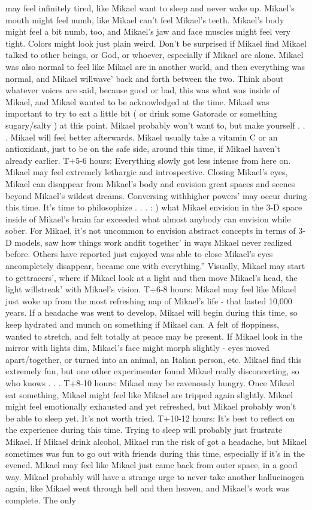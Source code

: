 \documentclass[12pt]{book}
\begin{document}
may feel infinitely tired, like Mikael want to sleep and never wake up. Mikael's mouth might feel numb, like Mikael can't feel Mikael's teeth. Mikael's body might feel a bit numb, too, and Mikael's jaw and face muscles might feel very tight. Colors might look just plain weird. Don't be surprised if Mikael find Mikael talked to other beings, or God, or whoever, especially if Mikael are alone. Mikael was also normal to feel like Mikael are in another world, and then everything was normal, and Mikael willwave' back and forth between the two. Think about whatever voices are said, because good or bad, this was what was inside of Mikael, and Mikael wanted to be acknowledged at the time. Mikael was important to try to eat a little bit ( or drink some Gatorade or something sugary/salty ) at this point. Mikael probably won't want to, but make yourself . . .  Mikael will feel better afterwards. Mikael usually take a vitamin C or an antioxidant, just to be on the safe side, around this time, if Mikael haven't already earlier. T+5-6 hours: Everything slowly got less intense from here on. Mikael may feel extremely lethargic and introspective. Closing Mikael's eyes, Mikael can disappear from Mikael's body and envision great spaces and scenes beyond Mikael's wildest dreams. Conversing withhigher powers' may occur during this time. It's time to philosophize . . . : ) what Mikael envision in the 3-D space inside of Mikael's brain far exceeded what almost anybody can envision while sober. For Mikael, it's not uncommon to envision abstract concepts in terms of 3-D models, saw how things work andfit together' in ways Mikael never realized before. Others have reported just enjoyed was able to close Mikael's eyes ancompletely disappear, became one with everything.'' Visually, Mikael may start to gettracers', where if Mikael look at a light and then move Mikael's head, the light willstreak' with Mikael's vision. T+6-8 hours: Mikael may feel like Mikael just woke up from the most refreshing nap of Mikael's life - that lasted 10,000 years. If a headache was went to develop, Mikael will begin during this time, so keep hydrated and munch on something if Mikael can. A felt of floppiness, wanted to stretch, and felt totally at peace may be present. If Mikael look in the mirror with lights dim, Mikael's face might morph slightly - eyes moved apart/together, or turned into an animal, an Italian person, etc. Mikael find this extremely fun, but one other experimenter found Mikael really disconcerting, so who knows . . .  T+8-10 hours: Mikael may be ravenously hungry. Once Mikael eat something, Mikael might feel like Mikael are tripped again slightly. Mikael might feel emotionally exhausted and yet refreshed, but Mikael probably won't be able to sleep yet. It's not worth tried. T+10-12 hours: It's best to reflect on the experience during this time. Trying to sleep will probably just frustrate Mikael. If Mikael drink alcohol, Mikael run the risk of got a headache, but Mikael sometimes was fun to go out with friends during this time, especially if it's in the evened. Mikael may feel like Mikael just came back from outer space, in a good way. Mikael probably will have a strange urge to never take another hallucinogen again, like Mikael went through hell and then heaven, and Mikael's work was complete. The only 
\end{document}
